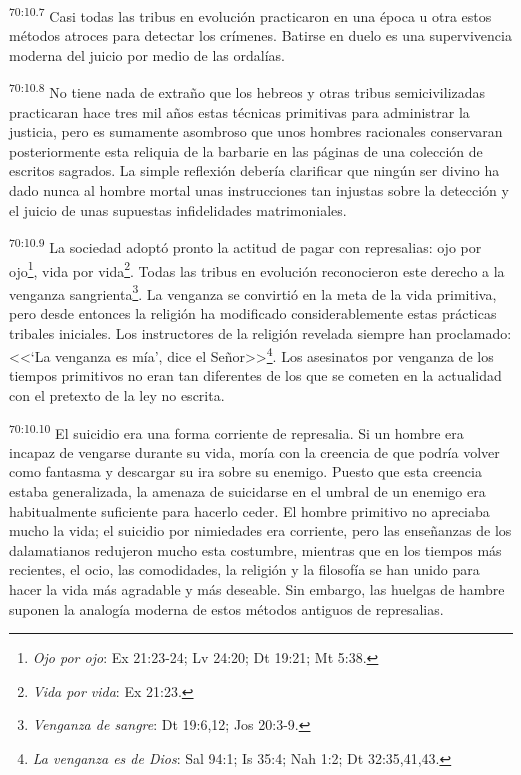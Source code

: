 \par
\textsuperscript{70:10.7} Casi todas las tribus en evolución practicaron en una época u otra estos métodos atroces para detectar los crímenes. Batirse en duelo es una supervivencia moderna del juicio por medio de las ordalías.

\par
\textsuperscript{70:10.8} No tiene nada de extraño que los hebreos y otras tribus semicivilizadas practicaran hace tres mil años estas técnicas primitivas para administrar la justicia, pero es sumamente asombroso que unos hombres racionales conservaran posteriormente esta reliquia de la barbarie en las páginas de una colección de escritos sagrados. La simple reflexión debería clarificar que ningún ser divino ha dado nunca al hombre mortal unas instrucciones tan injustas sobre la detección y el juicio de unas supuestas infidelidades matrimoniales.

\par
\textsuperscript{70:10.9} La sociedad adoptó pronto la actitud de pagar con represalias: ojo por ojo\footnote{\textit{Ojo por ojo}: Ex 21:23-24; Lv 24:20; Dt 19:21; Mt 5:38.}, vida por vida\footnote{\textit{Vida por vida}: Ex 21:23.}. Todas las tribus en evolución reconocieron este derecho a la venganza sangrienta\footnote{\textit{Venganza de sangre}: Dt 19:6,12; Jos 20:3-9.}. La venganza se convirtió en la meta de la vida primitiva, pero desde entonces la religión ha modificado considerablemente estas prácticas tribales iniciales. Los instructores de la religión revelada siempre han proclamado: <<`La venganza es mía', dice el Señor>>\footnote{\textit{La venganza es de Dios}: Sal 94:1; Is 35:4; Nah 1:2; Dt 32:35,41,43.}. Los asesinatos por venganza de los tiempos primitivos no eran tan diferentes de los que se cometen en la actualidad con el pretexto de la ley no escrita.

\par
\textsuperscript{70:10.10} El suicidio era una forma corriente de represalia. Si un hombre era incapaz de vengarse durante su vida, moría con la creencia de que podría volver como fantasma y descargar su ira sobre su enemigo. Puesto que esta creencia estaba generalizada, la amenaza de suicidarse en el umbral de un enemigo era habitualmente suficiente para hacerlo ceder. El hombre primitivo no apreciaba mucho la vida; el suicidio por nimiedades era corriente, pero las enseñanzas de los dalamatianos redujeron mucho esta costumbre, mientras que en los tiempos más recientes, el ocio, las comodidades, la religión y la filosofía se han unido para hacer la vida más agradable y más deseable. Sin embargo, las huelgas de hambre suponen la analogía moderna de estos métodos antiguos de represalias.

